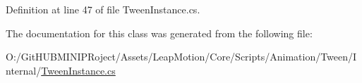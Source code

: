 Definition at line 47 of file Tween\+Instance.\+cs.



The documentation for this class was generated from the following file\+:\begin{DoxyCompactItemize}
\item 
O\+:/\+Git\+H\+U\+B\+M\+I\+N\+I\+P\+Roject/\+Assets/\+Leap\+Motion/\+Core/\+Scripts/\+Animation/\+Tween/\+Internal/\mbox{\hyperlink{_tween_instance_8cs}{Tween\+Instance.\+cs}}\end{DoxyCompactItemize}
